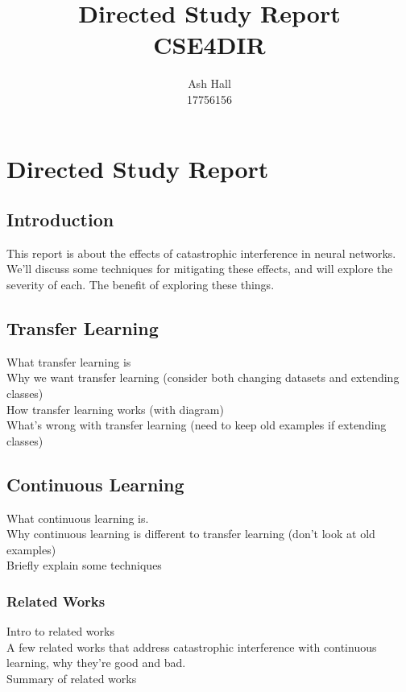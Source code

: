 \documentclass{report}
\title{Directed Study Report\\CSE4DIR}
\author{Ash Hall\\17756156}
\begin{document}
	\maketitle
	\thispagestyle{empty}
	\newpage
	\thispagestyle{empty}
	\tableofcontents
	\newpage
	\thispagestyle{empty}
	\newpage
	
	\setcounter{chapter}{1}	
	\chapter*{Directed Study Report}

	\section{Introduction}
	This report is about the effects of catastrophic interference in neural networks. \\
	We'll discuss some techniques for mitigating these effects, and will explore the severity of each.
	The benefit of exploring these things. \\
	
	
	\section{Transfer Learning}
	What transfer learning is \\
	Why we want transfer learning (consider both changing datasets and extending classes) \\
	How transfer learning works (with diagram) \\
	What's wrong with transfer learning (need to keep old examples if extending classes) \\
	
	\section{Continuous Learning}
	What continuous learning is. \\
	Why continuous learning is different to transfer learning (don't look at old examples) \\
	Briefly explain some techniques \\

	\subsection{Related Works}
	Intro to related works \\
	A few related works that address catastrophic interference	with continuous learning, why they're good and bad. \\
	Summary of related works \\
\end{document}
